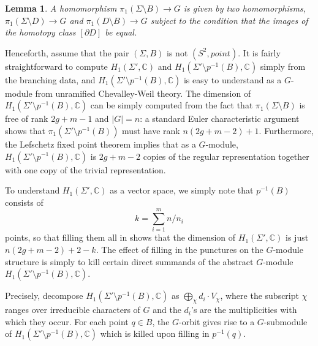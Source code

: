 \documentclass[11pt]{amsart}
\newtheorem{lemma}[thm]{Lemma}
\numberwithin{thm}{section}
\begin{document}
\begin{lemma}\label{t:tech}
A homomorphism $\pi_1(\Sigma\setminus B)\to G$ is given by two homomorphisms, $\pi_1(\Sigma\setminus D)\to G$ and $\pi_1(D\setminus B)\to G$ subject to the condition that the images of the homotopy class $[\partial D]$ be equal.
\end{lemma}

Henceforth, assume that the pair $(\Sigma,B)$ is not $(S^2,point)$.  It is fairly straightforward to compute $H_1(\Sigma',{\mathbb{C}})$ and $H_1(\Sigma'\setminus p^{-1}(B),{\mathbb{C}})$ simply from the branching data, and $H_1(\Sigma'\setminus p^{-1}(B),{\mathbb{C}})$ is easy to understand as a $G$-module from unramified Chevalley-Weil theory.  The dimension of $H_1(\Sigma'\setminus p^{-1}(B),{\mathbb{C}})$ can be simply computed from the fact that $\pi_1(\Sigma\setminus B)$ is free of rank $2g+m-1$ and $|G|=n$: a standard Euler characteristic argument shows that $\pi_1(\Sigma'\setminus p^{-1}(B))$ must have rank $n(2g+m-2)+1$.  Furthermore, the Lefschetz fixed point theorem implies that as a $G$-module, $H_1(\Sigma'\setminus p^{-1}(B),{\mathbb{C}})$ is $2g+m-2$ copies of the regular representation together with one copy of the trivial representation.

To understand $H_1(\Sigma',{\mathbb{C}})$ as a vector space, we simply note that $p^{-1}(B)$ consists of \[k=\sum_{i=1}^m n/n_i\] points, so that filling them all in shows that the dimension of $H_1(\Sigma',{\mathbb{C}})$ is just $n(2g+m-2)+2-k$.  The effect of filling in the punctures on the $G$-module structure is simply to kill certain direct summands of the abstract $G$-module $H_1(\Sigma'\setminus p^{-1}(B),{\mathbb{C}})$.

Precisely, decompose $H_1(\Sigma'\setminus p^{-1}(B),{\mathbb{C}})$ as $\bigoplus_{\chi} d_i\cdot V_{\chi}$, where the subscript $\chi$ ranges over irreducible characters of $G$ and the $d_i$'s are the multiplicities with which they occur.  For each point $q\in B$, the $G$-orbit gives rise to a $G$-submodule of $H_1(\Sigma'\setminus p^{-1}(B),{\mathbb{C}})$ which is killed upon filling in $p^{-1}(q)$.
\end{document}
